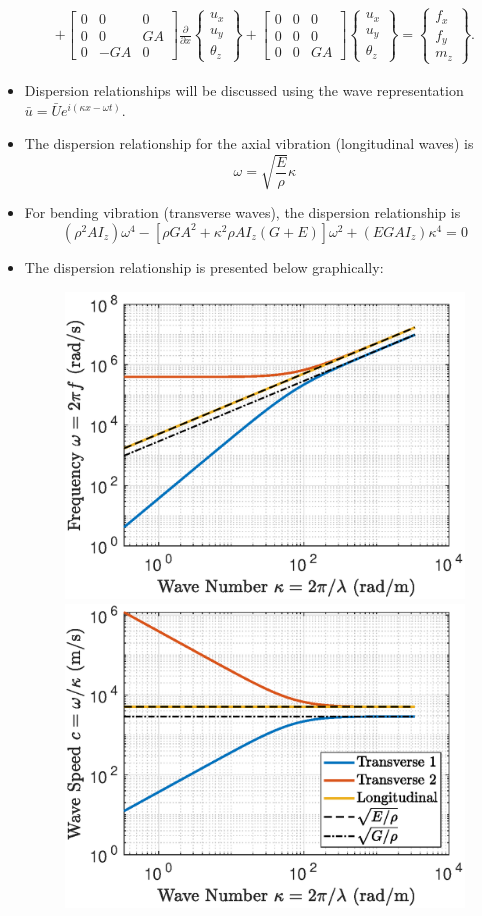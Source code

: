 \documentclass[aspectratio=169]{beamertmd}
\begin{document}
\begin{frame}[allowframebreaks]
\begin{itemize}
{\begin{align*}
        + \begin{bmatrix} 0 & 0 & 0\\ 0 & 0 & GA \\ 0 & -GA &
          0 \end{bmatrix} \frac{\partial}{\partial x}\begin{Bmatrix}
          u_x\\u_y\\\theta_z \end{Bmatrix} + \begin{bmatrix} 0 & 0 & 0
          \\ 0 & 0 & 0 \\ 0 & 0 & GA \end{bmatrix} \begin{Bmatrix}
          u_x\\ u_y\\\theta_z \end{Bmatrix} = \begin{Bmatrix} f_x\\
          f_y\\ m_z\end{Bmatrix}. 
      \end{align*}}
    \pagebreak
  \item Dispersion relationships will be discussed using the wave
    representation $\bar{u} = \bar{U} e^{i(\kappa x-\omega t)}$. 
  \item The dispersion relationship for the axial vibration
    (longitudinal waves) is
    $$ \omega = \sqrt{\frac{E}{\rho}} \kappa $$
  \item For bending vibration (transverse waves), the dispersion
    relationship is
    $$ (\rho^2AI_z)\omega^4 - \left[\rho GA^2+\kappa^2\rho
      AI_z(G+E)\right] \omega^2 + (EGAI_z) \kappa^4 = 0 $$
    \pagebreak
  \item The dispersion relationship is presented below graphically:
    \begin{figure}[!h]
      \centering
      \includegraphics[width=0.35\linewidth]{../../PLANARMODEL/FIGS/TMWS_WvK}%
      \includegraphics[width=0.35\linewidth]{../../PLANARMODEL/FIGS/TMWS_CvK}%

\end{figure}
\end{itemize}
\end{frame}
\end{document}
